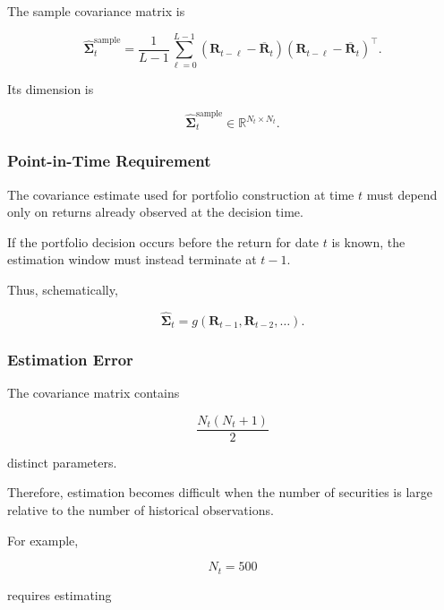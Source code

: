 \documentclass[11pt,a4paper]{article}
\begin{document}
The sample covariance matrix is

\begin{equation}
\boxed{
\widehat{\boldsymbol{\Sigma}}_t^{\mathrm{sample}}
=
\frac{1}{L-1}
\sum_{\ell=0}^{L-1}
\left(
\mathbf{R}_{t-\ell}
-
\overline{\mathbf{R}}_t
\right)
\left(
\mathbf{R}_{t-\ell}
-
\overline{\mathbf{R}}_t
\right)^\top.
}
\end{equation}

Its dimension is

\begin{equation}
\widehat{\boldsymbol{\Sigma}}_t^{\mathrm{sample}}
\in
\mathbb{R}^{N_t\times N_t}.
\end{equation}


\subsubsection{Point-in-Time Requirement}

The covariance estimate used for portfolio construction at time $t$ must depend
only on returns already observed at the decision time.

If the portfolio decision occurs before the return for date $t$ is known, the
estimation window must instead terminate at $t-1$.

Thus, schematically,

\begin{equation}
\boxed{
\widehat{\boldsymbol{\Sigma}}_t
=
g
\left(
\mathbf{R}_{t-1},
\mathbf{R}_{t-2},
\ldots
\right).
}
\end{equation}


\subsubsection{Estimation Error}

The covariance matrix contains

\begin{equation}
\frac{
N_t(N_t+1)
}{
2
}
\end{equation}

distinct parameters.

Therefore, estimation becomes difficult when the number of securities is large
relative to the number of historical observations.

For example,

\begin{equation}
N_t=500
\end{equation}

requires estimating
\end{document}
